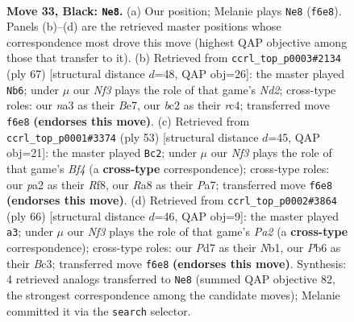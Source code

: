 \documentclass[11pt]{article}
\begin{document}
\clearpage

\begin{figure}[p]\centering
\begin{subfigure}{0.46\textwidth}\centering
\resizebox{\linewidth}{!}{%
\newchessgame
\chessboard[
  setfen={r7/p1pp4/1p3nk1/5p1p/2P2P2/NP6/P1BP2bP/R3K3 b - - 5 33},
  showmover=false,
  pgfstyle=straightmove, color=movearrow, markmove={f6-e8}
]}
\caption{}
\end{subfigure}\hfill
\begin{subfigure}{0.46\textwidth}\centering
\resizebox{\linewidth}{!}{%
\newchessgame
\chessboard[
  setfen={8/r2nbpk1/6pp/4p3/p1R1P3/3N1P2/PPB2PK1/8 b - - 4 34},
  showmover=false,
  pgfstyle=straightmove, color=movearrow, markmove={d7-b6}
]}
\caption{}
\end{subfigure}
\\[4pt]
\begin{subfigure}{0.46\textwidth}\centering
\resizebox{\linewidth}{!}{%
\newchessgame
\chessboard[
  setfen={5rk1/p5pp/2p1np2/4pb2/1PP5/PN3BP1/5PP1/3R2K1 b - - 0 27},
  showmover=false,
  pgfstyle=straightmove, color=movearrow, markmove={f5-c2}
]}
\caption{}
\end{subfigure}\hfill
\begin{subfigure}{0.46\textwidth}\centering
\resizebox{\linewidth}{!}{%
\newchessgame
\chessboard[
  setfen={3r2k1/6bp/4p1p1/1b2np2/1N6/2B1PP2/P4KPP/1N5R w - - 0 34},
  showmover=false,
  pgfstyle=straightmove, color=movearrow, markmove={a2-a3}
]}
\caption{}
\end{subfigure}
\caption{\textbf{Move 33, Black: \texttt{Ne8}.} (a) Our position; Melanie plays \texttt{Ne8} (\texttt{f6e8}). Panels (b)--(d) are the retrieved master positions whose correspondence most drove this move (highest QAP objective among those that transfer to it). (b) Retrieved from \texttt{ccrl\_top\_p0003\#2134} (ply 67) [structural distance $d$=48, QAP obj=26]: the master played \texttt{Nb6}; under $\mu$ our \emph{Nf3} plays the role of that game's \emph{Nd2}; cross-type roles: our \emph{n}a3 as their \emph{B}e7, our \emph{b}c2 as their \emph{r}c4; transferred move \texttt{f6e8} \textbf{(endorses this move)}. (c) Retrieved from \texttt{ccrl\_top\_p0001\#3374} (ply 53) [structural distance $d$=45, QAP obj=21]: the master played \texttt{Bc2}; under $\mu$ our \emph{Nf3} plays the role of that game's \emph{Bf4} (a \textbf{cross-type} correspondence); cross-type roles: our \emph{p}a2 as their \emph{R}f8, our \emph{R}a8 as their \emph{P}a7; transferred move \texttt{f6e8} \textbf{(endorses this move)}. (d) Retrieved from \texttt{ccrl\_top\_p0002\#3864} (ply 66) [structural distance $d$=46, QAP obj=9]: the master played \texttt{a3}; under $\mu$ our \emph{Nf3} plays the role of that game's \emph{Pa2} (a \textbf{cross-type} correspondence); cross-type roles: our \emph{P}d7 as their \emph{N}b1, our \emph{P}b6 as their \emph{B}c3; transferred move \texttt{f6e8} \textbf{(endorses this move)}. Synthesis: 4 retrieved analogs transferred to \texttt{Ne8} (summed QAP objective 82, the strongest correspondence among the candidate moves); Melanie committed it via the \texttt{search} selector.}
\label{fig:thought-m65}
\end{figure}
\end{document}
